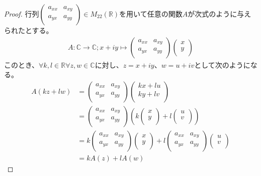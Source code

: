 \documentclass[dvipdfmx]{jsarticle}
\begin{document}
\begin{proof} 行列$\begin{pmatrix}
a_{xx} & a_{xy} \\
a_{yx} & a_{yy} \\
\end{pmatrix} \in M_{22}\left( \mathbb{R} \right)$を用いて任意の関数$A$が次式のように与えられたとする。
\begin{align*}
A:\mathbb{C} \rightarrow \mathbb{C};x+iy \mapsto \begin{pmatrix}
a_{xx} & a_{xy} \\
a_{yx} & a_{yy} \\
\end{pmatrix}\begin{pmatrix}
x \\
y \\
\end{pmatrix}
\end{align*}
このとき、$\forall k,l \in \mathbb{R}\forall z,w \in \mathbb{C}$に対し、$z=x+iy$、$w=u+iv$として次のようになる。
\begin{align*}
A(kz + lw) &= \begin{pmatrix}
a_{xx} & a_{xy} \\
a_{yx} & a_{yy} \\
\end{pmatrix}\begin{pmatrix}
kx + lu \\
ky + lv \\
\end{pmatrix}\\
&= \begin{pmatrix}
a_{xx} & a_{xy} \\
a_{yx} & a_{yy} \\
\end{pmatrix}\left( k\begin{pmatrix}
x \\
y \\
\end{pmatrix} + l\begin{pmatrix}
u \\
v \\
\end{pmatrix} \right)\\
&= k\begin{pmatrix}
a_{xx} & a_{xy} \\
a_{yx} & a_{yy} \\
\end{pmatrix}\begin{pmatrix}
x \\
y \\
\end{pmatrix} + l\begin{pmatrix}
a_{xx} & a_{xy} \\
a_{yx} & a_{yy} \\
\end{pmatrix}\begin{pmatrix}
u \\
v \\
\end{pmatrix}\\
&= kA(z) + lA(w)
\end{align*}
\end{proof}
\end{document}
